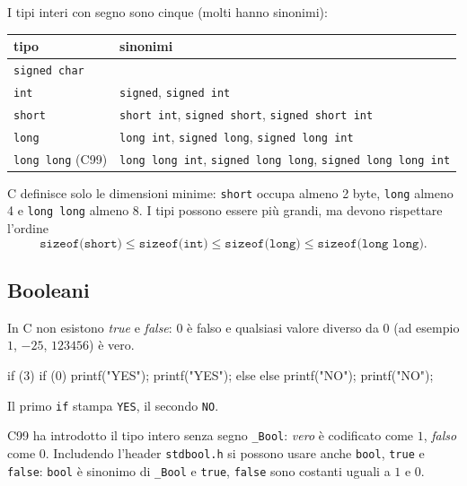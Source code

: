 \documentclass[11pt,a4paper]{article}
\begin{document}
I tipi interi con segno sono cinque (molti hanno sinonimi):
\begin{center}
\begin{tabular}{ll}
\toprule
\textbf{tipo} & \textbf{sinonimi} \\
\midrule
\lstinline|signed char| & \\
\lstinline|int| & \lstinline|signed|, \lstinline|signed int| \\
\lstinline|short| & \lstinline|short int|, \lstinline|signed short|, \lstinline|signed short int| \\
\lstinline|long| & \lstinline|long int|, \lstinline|signed long|, \lstinline|signed long int| \\
\lstinline|long long| (C99) & \lstinline|long long int|, \lstinline|signed long long|, \lstinline|signed long long int| \\
\bottomrule
\end{tabular}
\end{center}

C definisce solo le dimensioni minime: \lstinline|short| occupa almeno 2 byte,
\lstinline|long| almeno 4 e \lstinline|long long| almeno 8. I tipi possono essere
più grandi, ma devono rispettare l'ordine
\[
  \texttt{sizeof(short)} \leq \texttt{sizeof(int)} \leq \texttt{sizeof(long)}
  \leq \texttt{sizeof(long long)} .
\]

\subsection{Booleani}

In C non esistono \emph{true} e \emph{false}: $0$ è falso e qualsiasi valore
diverso da $0$ (ad esempio $1$, $-25$, $123456$) è vero.

\begin{codice}
if (3)                      if (0)
    printf("YES\n");            printf("YES\n");
else                        else
    printf("NO\n");             printf("NO\n");
\end{codice}

Il primo \lstinline|if| stampa \texttt{YES}, il secondo \texttt{NO}.

C99 ha introdotto il tipo intero senza segno \lstinline|_Bool|: \emph{vero} è
codificato come $1$, \emph{falso} come $0$. Includendo l'header
\lstinline|stdbool.h| si possono usare anche \lstinline|bool|, \lstinline|true| e
\lstinline|false|: \lstinline|bool| è sinonimo di \lstinline|_Bool| e
\lstinline|true|, \lstinline|false| sono costanti uguali a $1$ e $0$.
\end{document}
